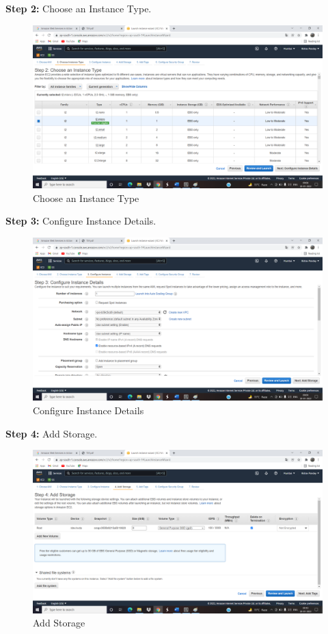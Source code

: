 \documentclass[12pt]{article}
\begin{document}
\textbf{Step 2:} Choose an Instance Type.
\begin{figure}[h]
\centering
\includegraphics[scale=0.265]{Untitled7.png}
\caption{Choose an Instance Type}
\label{Choose an Instance Type}
\end{figure}

\textbf{Step 3:} Configure Instance Details.
\begin{figure}[h]
\centering
\includegraphics[scale=0.265]{Untitled8.png}
\caption{Configure Instance Details}
\label{Configure Instance Details}
\end{figure}
\clearpage

\textbf{Step 4:} Add Storage.
\begin{figure}[h]
\centering
\includegraphics[scale=0.265]{Untitled9.png}
\caption{Add Storage}
\label{Add Storage}
\end{figure}
\end{document}
